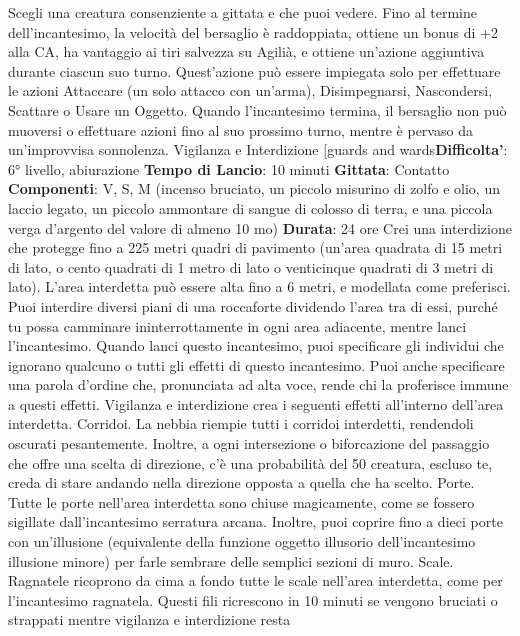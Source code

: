 \begin{multicols}{2}
Scegli una creatura consenziente a gittata e che puoi
vedere. Fino al termine dell’incantesimo, la velocità del
bersaglio è raddoppiata, ottiene un bonus di +2 alla CA,
ha vantaggio ai tiri salvezza su Agilià, e ottiene
un’azione aggiuntiva durante ciascun suo turno.
Quest’azione può essere impiegata solo per effettuare
le azioni Attaccare (un solo attacco con un’arma),
Disimpegnarsi, Nascondersi, Scattare o Usare un
Oggetto.
Quando l’incantesimo termina, il bersaglio non può
muoversi o effettuare azioni fino al suo prossimo turno,
mentre è pervaso da un’improvvisa sonnolenza.
Vigilanza e Interdizione
[guards and wards\textbf{Difficolta'}:
6° livello, abiurazione
\textbf{Tempo di Lancio}: 10 minuti
\textbf{Gittata}: Contatto
\textbf{Componenti}: V, S, M (incenso bruciato, un piccolo
misurino di zolfo e olio, un laccio legato, un piccolo
ammontare di sangue di colosso di terra, e una piccola
verga d’argento del valore di almeno 10 mo)
\textbf{Durata}: 24 ore
Crei una interdizione che protegge fino a 225 metri
quadri di pavimento (un’area quadrata di 15 metri di
lato, o cento quadrati di 1 metro di lato o venticinque
quadrati di 3 metri di lato). L’area interdetta può essere
alta fino a 6 metri, e modellata come preferisci. Puoi
interdire diversi piani di una roccaforte dividendo l’area
tra di essi, purché tu possa camminare
ininterrottamente in ogni area adiacente, mentre lanci
l’incantesimo.
Quando lanci questo incantesimo, puoi specificare gli
individui che ignorano qualcuno o tutti gli effetti di
questo incantesimo. Puoi anche specificare una parola
d’ordine che, pronunciata ad alta voce, rende chi la
proferisce immune a questi effetti.
Vigilanza e interdizione crea i seguenti effetti all’interno
dell’area interdetta.
Corridoi. La nebbia riempie tutti i corridoi interdetti,
rendendoli oscurati pesantemente. Inoltre, a ogni
intersezione o biforcazione del passaggio che offre una
scelta di direzione, c’è una probabilità del 50%
creatura, escluso te, creda di stare andando nella
direzione opposta a quella che ha scelto.
Porte. Tutte le porte nell’area interdetta sono chiuse
magicamente, come se fossero sigillate
dall’incantesimo serratura arcana. Inoltre, puoi coprire
fino a dieci porte con un’illusione (equivalente della
funzione oggetto illusorio dell’incantesimo illusione
minore) per farle sembrare delle semplici sezioni di
muro.
Scale. Ragnatele ricoprono da cima a fondo tutte le
scale nell’area interdetta, come per l’incantesimo
ragnatela. Questi fili ricrescono in 10 minuti se vengono
bruciati o strappati mentre vigilanza e interdizione resta

\end{multicols}
